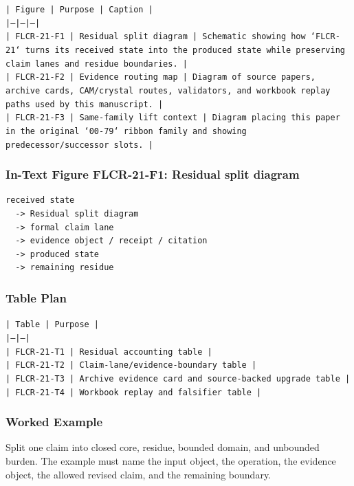 \documentclass[11pt]{article}
\begin{document}
\noindent\texttt{| Figure | Purpose | Caption |}\\
\noindent\texttt{|---|---|---|}\\
\noindent\texttt{| FLCR-21-F1 | Residual split diagram | Schematic showing how `FLCR-21` turns its received state into the produced state while preserving claim lanes and residue boundaries. |}\\
\noindent\texttt{| FLCR-21-F2 | Evidence routing map | Diagram of source papers, archive cards, CAM/crystal routes, validators, and workbook replay paths used by this manuscript. |}\\
\noindent\texttt{| FLCR-21-F3 | Same-family lift context | Diagram placing this paper in the original `00-79` ribbon family and showing predecessor/successor slots. |}\\

\subsubsection*{In-Text Figure FLCR-21-F1: Residual split diagram}

\begin{verbatim}
received state
  -> Residual split diagram
  -> formal claim lane
  -> evidence object / receipt / citation
  -> produced state
  -> remaining residue
\end{verbatim}

\subsubsection*{Table Plan}

\noindent\texttt{| Table | Purpose |}\\
\noindent\texttt{|---|---|}\\
\noindent\texttt{| FLCR-21-T1 | Residual accounting table |}\\
\noindent\texttt{| FLCR-21-T2 | Claim-lane/evidence-boundary table |}\\
\noindent\texttt{| FLCR-21-T3 | Archive evidence card and source-backed upgrade table |}\\
\noindent\texttt{| FLCR-21-T4 | Workbook replay and falsifier table |}\\

\subsubsection*{Worked Example}

Split one claim into closed core, residue, bounded domain, and unbounded burden. The example must name the input object, the operation,
the evidence object, the allowed revised claim, and the remaining boundary.
\end{document}
